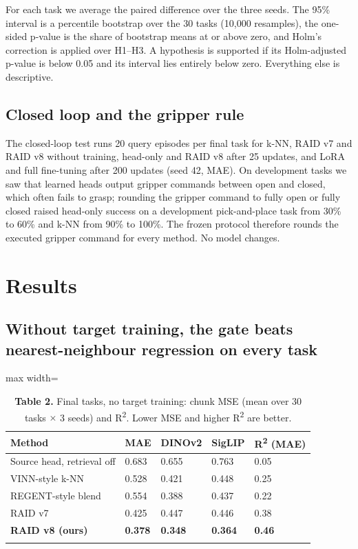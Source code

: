 \documentclass[10pt,twocolumn,letterpaper]{article}
\begin{document}
For each task we average the paired difference over the three seeds. The 95\% interval is a percentile bootstrap over the 30 tasks (10,000 resamples), the one-sided p-value is the share of bootstrap means at or above zero, and Holm's correction is applied over H1--H3. A hypothesis is supported if its Holm-adjusted p-value is below 0.05 and its interval lies entirely below zero. Everything else is descriptive.

\subsection{Closed loop and the gripper rule}

The closed-loop test runs 20 query episodes per final task for k-NN, RAID v7 and RAID v8 without training, head-only and RAID v8 after 25 updates, and LoRA and full fine-tuning after 200 updates (seed 42, MAE). On development tasks we saw that learned heads output gripper commands between open and closed, which often fails to grasp; rounding the gripper command to fully open or fully closed raised head-only success on a development pick-and-place task from 30\% to 60\% and k-NN from 90\% to 100\%. The frozen protocol therefore rounds the executed gripper command for every method. No model changes.

\section{Results}

\subsection{Without target training, the gate beats nearest-neighbour regression on every task}

\begin{table}[t]\centering\small
\caption*{\textbf{\sffamily Table 2.} Final tasks, no target training: chunk MSE (mean over 30 tasks \ensuremath{\times} 3 seeds) and R\textsuperscript{2}. Lower MSE and higher R\textsuperscript{2} are better.}
\begin{adjustbox}{max width=\linewidth}
\begin{tabular}{@{}lllll@{}}
\toprule\noalign{}
Method & MAE & DINOv2 & SigLIP & R\textsuperscript{2} (MAE) \\
\midrule\noalign{}
Source head, retrieval off & 0.683 & 0.655 & 0.763 & 0.05 \\
VINN-style k-NN & 0.528 & 0.421 & 0.448 & 0.25 \\
REGENT-style blend & 0.554 & 0.388 & 0.437 & 0.22 \\
RAID v7 & 0.425 & 0.447 & 0.446 & 0.38 \\
\textbf{RAID v8 (ours)} & \textbf{0.378} & \textbf{0.348} & \textbf{0.364} & \textbf{0.46} \\
\bottomrule\noalign{}
\end{tabular}
\end{adjustbox}
\end{table}
\end{document}
